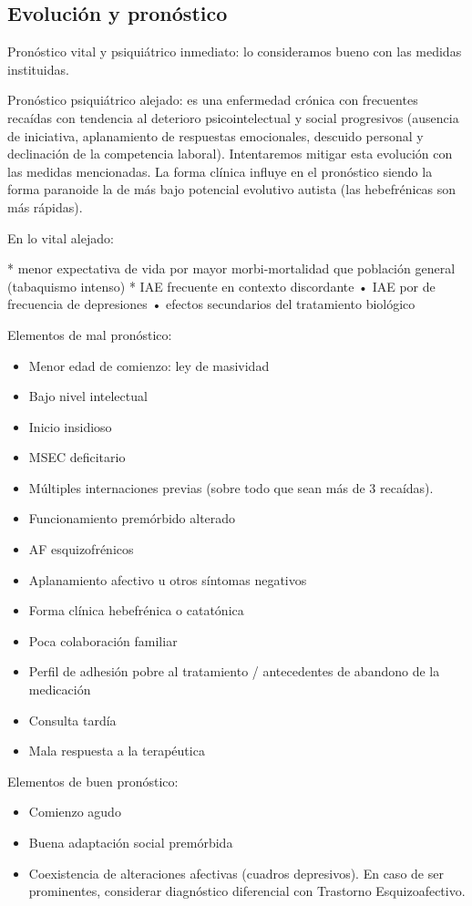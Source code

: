 \subsection*{Evolución y pronóstico}
Pronóstico vital y psiquiátrico inmediato: lo consideramos bueno con las medidas instituidas.

Pronóstico psiquiátrico alejado: es una enfermedad crónica con frecuentes recaídas con tendencia al deterioro psicointelectual y social progresivos (ausencia de iniciativa, aplanamiento de respuestas emocionales, descuido personal y declinación de la competencia laboral). Intentaremos mitigar esta evolución con las medidas mencionadas. La forma clínica influye en el pronóstico siendo la forma paranoide la de más bajo potencial evolutivo autista (las hebefrénicas son más rápidas).

En lo vital alejado:

* menor expectativa de vida por mayor morbi-mortalidad que población general (tabaquismo intenso)
* IAE frecuente en contexto discordante • IAE por de frecuencia de depresiones • efectos secundarios del tratamiento biológico

Elementos de mal pronóstico:
\begin{itemize}
    \item Menor edad de comienzo: ley de masividad
    \item Bajo nivel intelectual
    \item Inicio insidioso
    \item MSEC deficitario
    \item Múltiples internaciones previas (sobre todo que sean más de 3 recaídas).
    \item Funcionamiento premórbido alterado
    \item AF esquizofrénicos
    \item Aplanamiento afectivo u otros síntomas negativos
    \item Forma clínica hebefrénica o catatónica
    \item Poca colaboración familiar
    \item Perfil de adhesión pobre al tratamiento / antecedentes de abandono de la medicación
    \item Consulta tardía
    \item Mala respuesta a la terapéutica
\end{itemize}
Elementos de buen pronóstico:
\begin{itemize}
    \item Comienzo agudo
    \item Buena adaptación social premórbida
    \item Coexistencia de alteraciones afectivas (cuadros depresivos). En caso de ser prominentes, considerar diagnóstico diferencial con Trastorno Esquizoafectivo.
\end{itemize}
